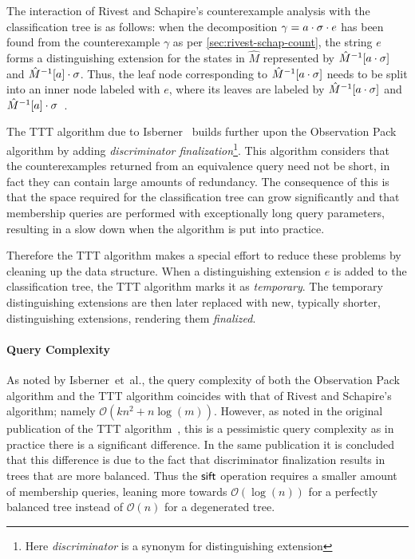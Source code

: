 The interaction of Rivest and Schapire's counterexample analysis with the
classification tree is as follows: when the decomposition
$\gamma = a \cdot \sigma \cdot e$ has been found from the counterexample
$\gamma$ as per \cref{sec:rivest-schap-count}, the string $e$ forms a
distinguishing extension for the states in $\hat M$ represented by
$\hat M^{-1}[a\cdot\sigma]$ and $\hat M^{-1}[a]\cdot\sigma$. Thus,
the leaf node corresponding to $\hat M^{-1}[a\cdot\sigma]$ needs to be
split into an inner node labeled with $e$, where its leaves are labeled by
$\hat M^{-1}[a\cdot\sigma]$ and
$\hat M^{-1}[a]\cdot\sigma$~\cite{Isberner2015a}.

The TTT algorithm due to Isberner~\cite{Isberner2014b} builds further upon the
Observation Pack algorithm by adding \textit{discriminator
  finalization}\footnote{Here \textit{discriminator} is a synonym for
  distinguishing extension}. This algorithm considers that the counterexamples
returned from an equivalence query need not be short, in fact they can contain
large amounts of redundancy. The consequence of this is that the space required
for the classification tree can grow significantly and that membership queries
are performed with exceptionally long query parameters, resulting in a slow down
when the algorithm is put into practice.

Therefore the TTT algorithm makes a special effort to reduce these problems by
cleaning up the data structure. When a distinguishing extension $e$ is added to
the classification tree, the TTT algorithm marks it as \textit{temporary}. The
temporary distinguishing extensions are then later replaced with new, typically
shorter, distinguishing extensions, rendering them \textit{finalized}.

\paragraph{Query Complexity} As noted by Isberner~et~al., the query complexity
of both the Observation Pack algorithm and the TTT algorithm coincides with that
of Rivest and Schapire's algorithm; namely $\mathcal{O}(kn^2 + n
\log(m))$. However, as noted in the original publication of the TTT
algorithm~\cite{Isberner2014b}, this is a pessimistic query complexity as in
practice there is a significant difference. In the same publication it is
concluded that this difference is due to the fact that discriminator
finalization results in trees that are more balanced. Thus the $\mathsf{sift}$ operation
requires a smaller amount of membership queries, leaning more towards
$\mathcal{O}(\log(n))$ for a perfectly balanced tree instead of $\mathcal{O}(n)$
for a degenerated tree.

